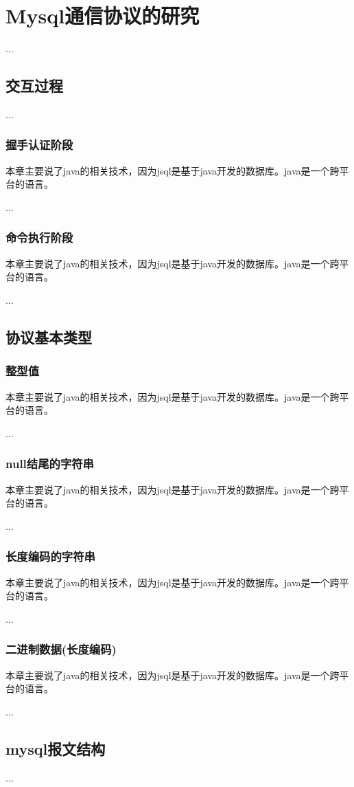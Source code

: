
\chapter{Mysql通信协议的研究}
...
\section{交互过程}
...
\subsection{握手认证阶段}
本章主要说了java的相关技术，因为jsql是基于java开发的数据库。java是一个跨平台的语言。

...
\subsection{命令执行阶段}
本章主要说了java的相关技术，因为jsql是基于java开发的数据库。java是一个跨平台的语言。

...
\section{协议基本类型}
\subsection{整型值}
本章主要说了java的相关技术，因为jsql是基于java开发的数据库。java是一个跨平台的语言。

...
\subsection{null结尾的字符串}
本章主要说了java的相关技术，因为jsql是基于java开发的数据库。java是一个跨平台的语言。

...
\subsection{长度编码的字符串}
本章主要说了java的相关技术，因为jsql是基于java开发的数据库。java是一个跨平台的语言。

...
\subsection{二进制数据(长度编码)}
本章主要说了java的相关技术，因为jsql是基于java开发的数据库。java是一个跨平台的语言。

...
\section{mysql报文结构}
...
